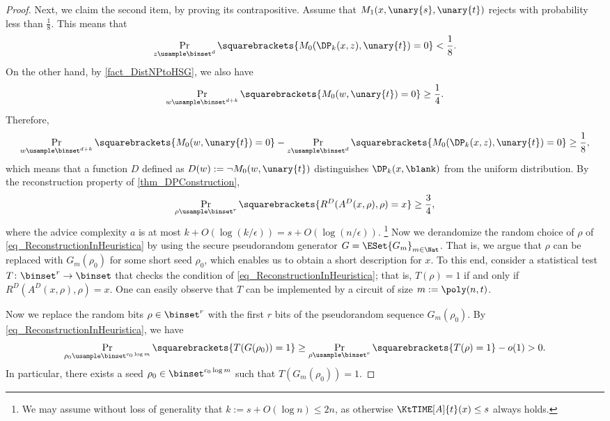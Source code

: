 \documentclass{toc}
\begin{document}
\begin{proof}
  Next, we claim the second item, by proving its contrapositive.
  Assume that $M_1(x, \unary{s}, \unary{t})$ rejects with probability less than $\frac{1}{8}$.
  This means that
  $$
    \Pr_{{z} \usample \binset^d} \squarebrackets{ M_0(\DP_k(x, {z}), \unary{t}) = 0 } < \frac{1}{8}.
  $$
  On the other hand, by \cref{fact_DistNPtoHSG}, we also have
  $$
    \Pr_{w \usample \binset^{d+k}} \squarebrackets{ M_0(w, \unary{t}) = 0 } \ge \frac{1}{4}.
  $$
  Therefore,
  $$
    \Pr_{w \usample \binset^{d+k}} \squarebrackets{ M_0(w, \unary{t}) = 0 }
    -
    \Pr_{{z} \usample \binset^d} \squarebrackets{ M_0(\DP_k(x, {z}), \unary{t}) = 0 }
    \ge \frac{1}{8},
  $$
  which means that a function $D$ defined as $D(w) := \neg M_0(w, \unary{t})$ distinguishes $\DP_k(x, \blank)$ from the uniform distribution.
  By the reconstruction property of \cref{thm_DPConstruction},
  \begin{align}
    \label{eq_ReconstructionInHeuristica}
    \Pr_{\rho \usample \binset^r} \squarebrackets{ R^D(A^D(x, \rho), \rho) = x } \ge \frac{3}{4},
  \end{align}
  where the advice complexity $a$ is at most $k + O(\log (k / \epsilon)) = s + O(\log (n / \epsilon))$.%
  \footnote{We may assume without loss of generality that $k := s + O(\log n) \le 2 n$,
    as otherwise $\KtTIME[A]{t}(x) \le s$ always holds. }
  Now we derandomize the random choice of $\rho$ of \cref{eq_ReconstructionInHeuristica}
  by using the secure pseudorandom generator $G = \ESet{G_m}_{m \in \Nat}$.
  That is,
  we argue that $\rho$ can be replaced with $G_m(\rho_0)$ for some short seed $\rho_0$,
  which enables us to obtain a short description for $x$.
  To this end, consider a statistical test $T \colon \binset^r \to \binset$ that checks the condition of \cref{eq_ReconstructionInHeuristica}; that is,
  $T(\rho) = 1$ if and only if $R^D(A^D(x, \rho), \rho) = x$.
  One can easily observe that $T$ can be implemented by a circuit of size $m := \poly(n, t)$.


  Now we replace the random bits $\rho \in \binset^r$ with the first $r$ bits of the pseudorandom sequence $G_m(\rho_0)$.
  By \cref{eq_ReconstructionInHeuristica},
  we have
  $$
    \Pr_{\rho_0 \usample \binset^{c_0 \log m}} \squarebrackets{ T(G(\rho_0)) = 1 } \ge
    \Pr_{\rho \usample \binset^r} \squarebrackets{ T(\rho) = 1 } - o(1) > 0.
  $$
  In particular, there exists a seed $\rho_0 \in \binset^{c_0 \log m}$
  such that $T(G_m(\rho_0)) = 1$.


\end{proof}
\end{document}

